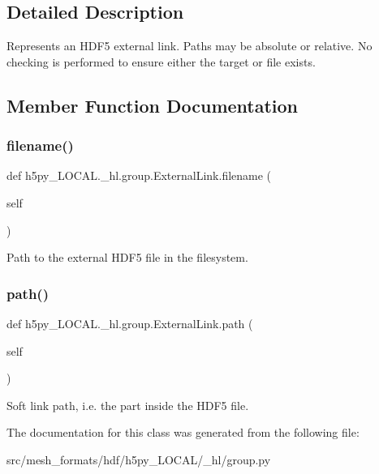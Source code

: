 \subsection{Detailed Description}
\begin{DoxyVerb}    Represents an HDF5 external link.  Paths may be absolute or relative.
    No checking is performed to ensure either the target or file exists.
\end{DoxyVerb}
 

\subsection{Member Function Documentation}
\mbox{\label{classh5py__LOCAL_1_1__hl_1_1group_1_1ExternalLink_acad29e48406b698e19ff65b74ba7233b}} 
\subsubsection{\texorpdfstring{filename()}{filename()}}
{\footnotesize\ttfamily def h5py\+\_\+\+L\+O\+C\+A\+L.\+\_\+hl.\+group.\+External\+Link.\+filename (\begin{DoxyParamCaption}\item[{}]{self }\end{DoxyParamCaption})}

\begin{DoxyVerb}Path to the external HDF5 file in the filesystem. \end{DoxyVerb}
 \mbox{\label{classh5py__LOCAL_1_1__hl_1_1group_1_1ExternalLink_a64bb6af7754a69a2393c0a70de4a6ec4}} 
\subsubsection{\texorpdfstring{path()}{path()}}
{\footnotesize\ttfamily def h5py\+\_\+\+L\+O\+C\+A\+L.\+\_\+hl.\+group.\+External\+Link.\+path (\begin{DoxyParamCaption}\item[{}]{self }\end{DoxyParamCaption})}

\begin{DoxyVerb}Soft link path, i.e. the part inside the HDF5 file. \end{DoxyVerb}
 

The documentation for this class was generated from the following file\+:\begin{DoxyCompactItemize}
\item 
src/mesh\+\_\+formats/hdf/h5py\+\_\+\+L\+O\+C\+A\+L/\+\_\+hl/group.\+py\end{DoxyCompactItemize}
